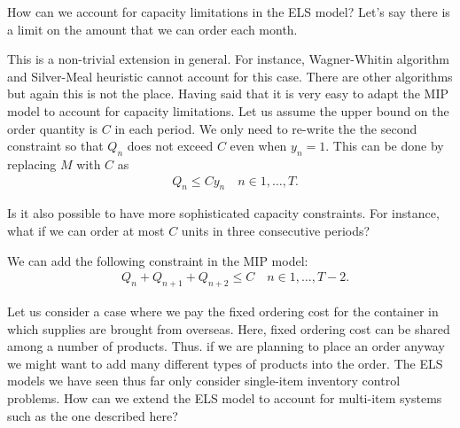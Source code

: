 \begin{question}
How can we account for capacity limitations in the ELS model? Let's say there is a limit on the amount that we can order each month.
\end{question}

\begin{solution}
This is a non-trivial extension in general. For instance, Wagner-Whitin algorithm and Silver-Meal heuristic cannot account for this case. There are other algorithms but again this is not the place. Having said that it is very easy to adapt the MIP model to account for capacity limitations. Let us assume the upper bound on the order quantity is $C$ in each period. We only need to re-write the the second constraint so that $Q_n$ does not exceed $C$ even when $y_n=1$. This can be done by replacing $M$ with $C$ as 
\begin{align*}
	& Q_n \leq C y_n \quad n\in 1,\ldots,T.
\end{align*}
\end{solution}

\begin{question}
Is it also possible to have more sophisticated capacity constraints. For instance, what if we can order at most $C$ units in three consecutive periods?
\end{question}

\begin{solution}
We can add the following constraint in the MIP model:
\begin{align*}
	& Q_n + Q_{n+1} + Q_{n+2} \leq C \quad n\in 1,\ldots,T-2.
\end{align*}
\end{solution}

\begin{question}
Let us consider a case where we pay the fixed ordering cost for the container in which supplies are brought from overseas. Here, fixed ordering cost can be shared among a number of products. Thus. if we are planning to place an order anyway we might want to add many different types of products into the order. The ELS models we have seen thus far only consider single-item inventory control problems. How can we extend the ELS model to account for multi-item systems such as the one described here? 
\end{question}

